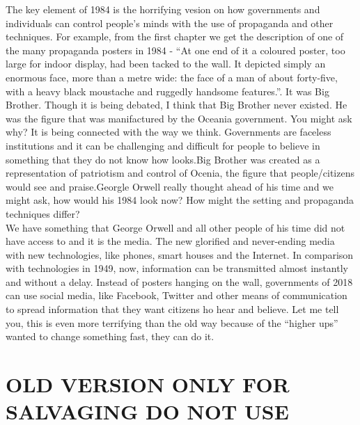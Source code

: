 \documentclass[a4paper,12pt]{article}
\begin{document}
The key element of 1984 is the horrifying vesion on how governments and individuals can control people's minds with the use of propaganda and other techniques. For example, from the first chapter we get the description of one of the many propaganda posters in 1984 - ``At one end of it a coloured poster, too large for indoor display, had been tacked to the wall. It depicted simply an enormous face, more than a metre wide: the face of a man of about forty-five, with a heavy black moustache and ruggedly handsome features.''. It was Big Brother. Though it is being debated, I think that Big Brother never existed. He was the figure that was manifactured by the Oceania government. You might ask why? It is being connected with the way we think. Governments are faceless institutions and it can be challenging and difficult for people to believe in something that they do not know how looks.Big Brother was created as a representation of patriotism and control of Ocenia, the figure that people/citizens would see and praise.Georgle Orwell really thought ahead of his time and we might ask, how would his 1984 look now? How might the setting and propaganda techniques differ?\\

We have something that George Orwell and all other people of his time did not have access to and it is the media. The new glorified and never-ending media with new technologies, like phones, smart houses and the Internet. In comparison with technologies in 1949, now, information can be transmitted almost instantly and without a delay. Instead of posters hanging on the wall, governments of 2018 can use social media, like Facebook, Twitter and other means of communication to spread information that they want citizens ho hear and believe. Let me tell you, this is even more terrifying than the old way because of the ``higher ups'' wanted to change something fast, they can do it.








\newpage
\section*{OLD VERSION ONLY FOR SALVAGING DO NOT USE}
\end{document}
